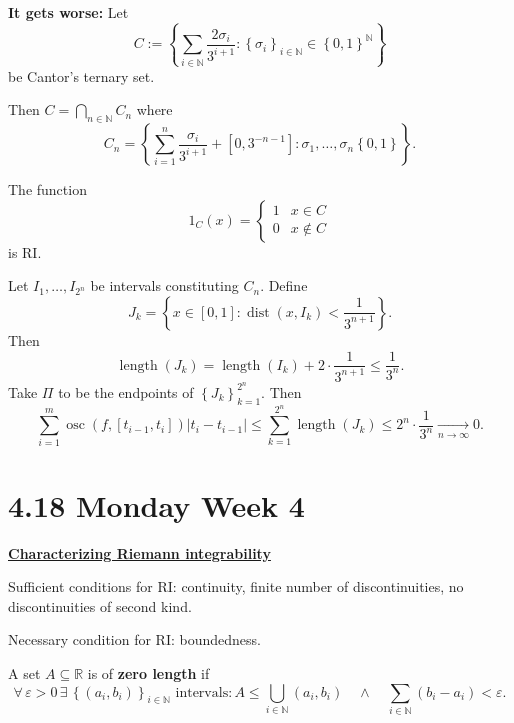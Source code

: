 \documentclass{notes}
\begin{document}
  {\boldmath \bfseries It gets worse:} Let 
  \[ 
    C := \left \{ \sum_{i \in \mathbb N} \frac{2 \sigma_i}{3^{i + 1}} : \left \{ \sigma_i \right \}_{i \in \mathbb N} \in \left \{ 0, 1 \right \}^\mathbb N \right \}
  \]
  be Cantor's ternary set.

  Then $C = \bigcap_{n \in \mathbb N} C_n$ where 
  \[
    C_n = \left \{ \sum_{i = 1}^n \frac{\sigma_i}{3^{i + 1}} + [0, 3^{-n - 1}] : \sigma_1, \dots, \sigma_n \left \{ 0, 1 \right \} \right \}.
  \]
  
  \begin{lem}
    The function 
    \[
      1_C(x) = \begin{cases}
        1 & x \in C \\ 
        0 & x \not \in C
      \end{cases}
    \]
    is RI.
  \end{lem}
  
  \begin{prf}
    Let $I_1, \dots, I_{2^n}$ be intervals constituting $C_n$.
    Define 
    \[
      J_k = \left \{ x \in [0, 1] : \operatorname{dist}(x, I_k) < \frac{1}{3^{n + 1}} \right \}.
    \]
    Then 
    \[
      \operatorname{length}(J_k) = \operatorname{length}(I_k) + 2 \cdot \frac{1}{3^{n + 1}} \leq \frac{1}{3^n}.
    \] 
    Take $\Pi$ to be the endpoints of $\left \{ J_k \right \}_{k = 1}^{2^n}$.
    Then 
    \[
      \sum_{i = 1}^m \operatorname{osc}(f, [t_{i - 1}, t_i]) \left | t_i - t_{i - 1} \right | \leq \sum_{k = 1}^{2^n} \operatorname{length}(J_k) \leq 2^n \cdot \frac{1}{3^n} \underset{n \to \infty}{\longrightarrow} 0.
    \]
  \end{prf}
  
  \section{4.18 Monday Week 4}
  
  {\boldmath \bfseries \underline{Characterizing Riemann integrability}}
  
  Sufficient conditions for RI: continuity, finite number of discontinuities, no discontinuities of second kind.

  Necessary condition for RI: boundedness.
  
  \begin{defn}
    A set $A \subseteq \mathbb R$ is of {\boldmath \bfseries zero length} if 
    \[
      \forall \, \varepsilon > 0 \, \exists \, \left \{ (a_i, b_i) \right \}_{i \in \mathbb N} \text{ intervals}: A \leq \bigcup_{i \in \mathbb N} (a_i, b_i) \quad \land \quad \sum_{i \in \mathbb N} (b_i - a_i) < \varepsilon.
    \]
  \end{defn}
  
\end{document}
